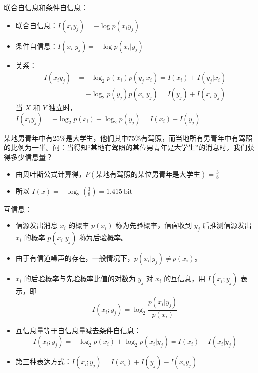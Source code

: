\begin{remark}
    联合自信息和条件自信息：
    \begin{itemize}
        \item 联合自信息：$I(x_i y_j) = -\log p(x_iy_j)$
        \item 条件自信息：$I(x_i|y_j) = -\log p(x_i|y_j)$
        \item 关系：\begin{align*}
            I\left(x_{i} y_{j}\right)&=-\log _{2} p\left(x_{i}\right) p\left(y_{j} | x_{i}\right)=I\left(x_{i}\right)+I\left(y_{j} | x_{i}\right) \\
            &=-\log _{2} p\left(y_{j}\right) p\left(x_{i} | y_{j}\right)=I\left(y_{j}\right)+I\left(x_{i} | y_{j}\right)
        \end{align*}
        当 $X$ 和 $Y$ 独立时，$I\left(x_{i} y_{j}\right)=-\log _{2} p\left(x_{i}\right)-\log _{2} p\left(y_{j}\right)=I\left(x_{i}\right)+I\left(y_{j}\right)$
    \end{itemize}
\end{remark}

\begin{remark}
    某地男青年中有25\%是大学生，他们其中75\%有驾照，而当地所有男青年中有驾照的比例为一半。问：当得知“某地有驾照的某位男青年是大学生”的消息时，我们获得多少信息量？
    \begin{itemize}
        \item 由贝叶斯公式计算得，$P(\text{某地有驾照的某位男青年是大学生}) = \frac{3}{8}$
        \item 所以 $I(x) = -\log_2(\frac{3}{8}) = \SI{1.415}{\mathrm{bit}}$ 
    \end{itemize}
\end{remark}

\begin{remark}
    互信息：
    \begin{itemize}
        \item 信源发出消息 $x_i$ 的概率 $p(x_i)$ 称为先验概率，信宿收到 $y_j$ 后推测信源发出 $x_i$ 的概率 $p(x_i|y_j)$ 称为后验概率。
        \item 由于有信道噪声的存在，一般情况下，$p(x_i|y_j) \neq p(x_i)$。
        \item $x_i$ 的后验概率与先验概率比值的对数为 $y_j$ 对 $x_i$ 的互信息，用 $I(x_i;y_j)$ 表示，即 \[I\left(x_{i} ; y_{j}\right)=\log _{2} \frac{p\left(x_{i} | y_{j}\right)}{p\left(x_{i}\right)} \]
        \item 互信息量等于自信息量减去条件自信息：\[I\left(x_{i} ; y_{j}\right)=-\log _{2} p\left(x_{i}\right)+\log _{2} p\left(x_{i} | y_{j}\right)=I\left(x_{i}\right)-I\left(x_{i} | y_{j}\right)\]
        \item 第三种表达方式：$I(x_i;y_j) = I(x_i) + I(y_j) - I(x_iy_j)$
    \end{itemize}
\end{remark}

